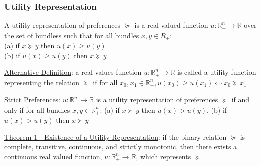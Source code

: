 \documentclass{article}
\begin{document}
\subsubsection{Utility Representation}
A utility representation of preferences $\succeq$ is a real valued function $u: \mathbb{R}_{+}^{n} \rightarrow \mathbb{R}$ over the set of bundless such that for all bundles $x,y \in R_{+}$: \\ (a) if $x \succeq y$ then $u(x) \geq u(y)$ \\ (b) if $u(x) \geq u(y)$ then $x \succeq y$ \par \vspace{0.3em}
  \underline{Alternative Definition}: a real values function $u: \mathbb{R}_{+}^{n} \rightarrow \mathbb{R}$ is called a utility function representing the relation $\succeq$ if for all $x_{0}, x_{1} \in \mathbb{R}_{+}^{n}, u(x_{0}) \geq u(x_{1}) \Longleftrightarrow x_{0} \succeq x_{1}$ \par
  \underline{Strict Preferences}: $u: \mathbb{R}_{+}^{n} \rightarrow \mathbb{R}$ is a utility representation of preferences $\succeq$ if and only if for all bundles $x, y \in \mathbb{R}_{+}^{n}$: (a) if $x \succ y$ then $u(x) > u(y)$, (b) if $u(x) > u(y)$ then $x \succ y$ \par
  \underline{Theorem 1 - Existence of a Utility Representation}: if the binary relation $\succeq$ is complete, transitive, continuous, and strictly monotonic, then there exists a continuous real valued function, $u: \mathbb{R}_{+}^{n} \rightarrow \mathbb{R}$, which represents $\succeq$
\end{document}
